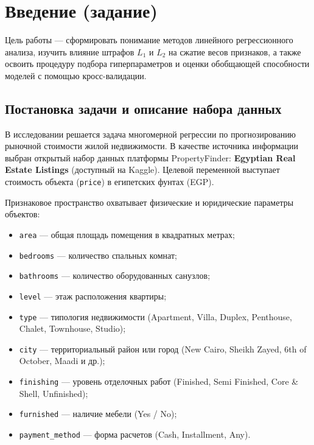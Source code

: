 \chapter*{Введение (задание)}

Цель работы — сформировать понимание методов линейного регрессионного анализа, изучить влияние штрафов $L_1$ и $L_2$ на сжатие весов признаков, а также освоить процедуру подбора гиперпараметров и оценки обобщающей способности моделей с помощью кросс-валидации.

\section*{Постановка задачи и описание набора данных}

В исследовании решается задача многомерной регрессии по прогнозированию рыночной стоимости жилой недвижимости. В качестве источника информации выбран открытый набор данных платформы PropertyFinder: \textbf{Egyptian Real Estate Listings} (доступный на Kaggle). Целевой переменной выступает стоимость объекта (\texttt{price}) в египетских фунтах (EGP).

Признаковое пространство охватывает физические и юридические параметры объектов:
\begin{itemize}
    \item \texttt{area} — общая площадь помещения в квадратных метрах;
    \item \texttt{bedrooms} — количество спальных комнат;
    \item \texttt{bathrooms} — количество оборудованных санузлов;
    \item \texttt{level} — этаж расположения квартиры;
    \item \texttt{type} — типология недвижимости (Apartment, Villa, Duplex, Penthouse, Chalet, Townhouse, Studio);
    \item \texttt{city} — территориальный район или город (New Cairo, Sheikh Zayed, 6th of October, Maadi и др.);
    \item \texttt{finishing} — уровень отделочных работ (Finished, Semi Finished, Core \& Shell, Unfinished);
    \item \texttt{furnished} — наличие мебели (Yes / No);
    \item \texttt{payment\_method} — форма расчетов (Cash, Installment, Any).
\end{itemize}

